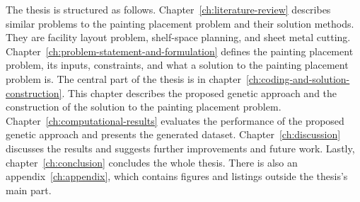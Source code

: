The thesis is structured as follows.
Chapter~\ref{ch:literature-review} describes similar problems to the painting placement problem and their solution methods.
They are facility layout problem, shelf-space planning, and sheet metal cutting.
Chapter~\ref{ch:problem-statement-and-formulation} defines the painting placement problem, its inputs, constraints, and what a solution to the painting placement problem is.
The central part of the thesis is in chapter~\ref{ch:coding-and-solution-construction}.
This chapter describes the proposed genetic approach and the construction of the solution to the painting placement problem.
Chapter~\ref{ch:computational-results} evaluates the performance of the proposed genetic approach
and presents the generated dataset.
Chapter~\ref{ch:discussion} discusses the results and suggests further improvements and future work.
Lastly, chapter~\ref{ch:conclusion} concludes the whole thesis.
There is also an appendix~\ref{ch:appendix}, which contains figures and listings outside the thesis's main part.
